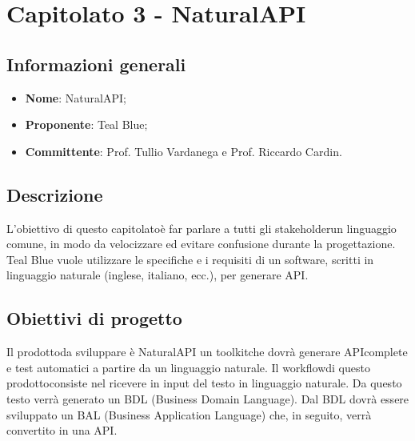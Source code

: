\section{Capitolato 3 - NaturalAPI}
\subsection{Informazioni generali}
\begin{itemize}
	\item \textbf{Nome}: NaturalAPI;
	\item \textbf{Proponente}: Teal Blue;
	\item \textbf{Committente}: Prof. Tullio Vardanega e Prof. Riccardo Cardin.
\end{itemize}
\subsection{Descrizione}
L'obiettivo di questo capitolato\glosp è far parlare a tutti gli stakeholder\glosp un linguaggio comune, in modo da velocizzare ed evitare confusione durante la progettazione\glo. Teal Blue vuole utilizzare le specifiche e i requisiti di un software, scritti in linguaggio naturale (inglese, italiano, ecc.), per generare API\glo.

\subsection{Obiettivi di progetto}
Il prodotto\glosp da sviluppare è NaturalAPI un toolkit\glosp che dovrà generare API\glosp complete e test automatici a partire da un linguaggio naturale. Il workflow\glosp di questo prodotto\glosp consiste nel ricevere in input del testo in linguaggio naturale. Da questo testo verrà generato un BDL (Business Domain Language). Dal BDL dovrà essere sviluppato un BAL (Business Application Language) che, in seguito, verrà convertito in una API\glo.

